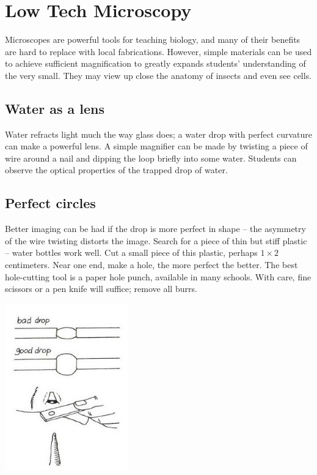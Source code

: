 \chapter{Low Tech Microscopy} 
\label{cha:microscopy}

\noindent Microscopes are powerful tools for teaching biology, and many of their benefits are hard to replace with local fabrications. However, simple materials can be used to achieve sufficient magnification to greatly expands students' understanding of the very small. They may view up close the anatomy of insects and even see cells.

\begin{multicols}{2}



\section{Water as a lens}
Water refracts light much the way glass does; a water drop with perfect curvature can make a powerful lens. A simple magnifier can be made by twisting a piece of wire around a nail and dipping the loop briefly into some water. Students can observe the optical properties of the trapped drop of water.

\section{Perfect circles}
Better imaging can be had if the drop is more perfect in shape -- the asymmetry of the wire twisting distorts the image. Search for a piece of thin but stiff plastic -- water bottles work well. Cut a small piece of this plastic, perhaps $1 \times 2$ centimeters. Near one end, make a hole, the more perfect the better. The best hole-cutting tool is a paper hole punch, available in many schools. With care, fine scissors or a pen knife will suffice; remove all burrs.
\begin{center}
\includegraphics[width=0.4\textwidth]{./img/vso/water-drop-2.jpg}
\end{center}


\end{multicols}
